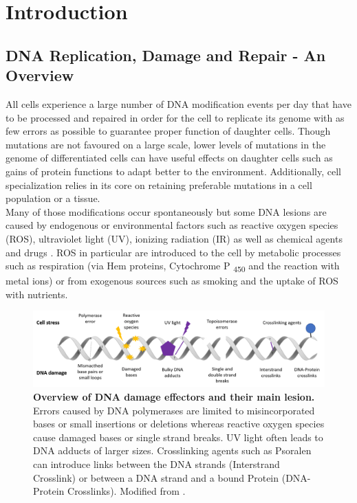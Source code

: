 \section{Introduction}
\label{sec:intro}
\subsection{DNA Replication, Damage and Repair -  An Overview}
All cells experience a large number of DNA modification events per day that have to be processed and repaired in order for the cell to replicate its genome with as few errors as possible to guarantee proper function of daughter cells. Though mutations are not favoured on a large scale, lower levels of mutations in the genome of differentiated cells can have useful effects on daughter cells such as gains of protein functions to adapt better to the environment. Additionally, cell specialization relies in its core on retaining preferable mutations in a cell population or a tissue.\\
Many of those modifications occur spontaneously but some DNA lesions are caused by endogenous or environmental factors such as reactive oxygen species (ROS), ultraviolet light (UV), ionizing radiation (IR) as well as chemical agents and drugs \citep{Loeb.2008}. ROS in particular are introduced to the cell by metabolic processes such as respiration (via Hem proteins, Cytochrome P \textsubscript{450} and the reaction with metal ions) or from exogenous sources such as smoking and the uptake of ROS with nutrients.\\
\begin{figure}[H]
        \includegraphics[width=\textwidth]{resources/images/Intro/damageTypes.png}
        \caption[Overview of DNA damage effectors and their main lesions]{\textbf{Overview of DNA damage effectors and their main lesion.} Errors caused by DNA polymerases are limited to misincorporated bases or small insertions or deletions whereas reactive oxygen species cause damaged bases or single strand breaks. UV light often leads to DNA adducts of larger sizes. Crosslinking agents such as Psoralen can introduce links between the DNA strands (Interstrand Crosslink) or between a DNA strand and a bound Protein (DNA-Protein Crosslinks). Modified from \cite{Massey.2018}.}
        \label{fig:damOverview}
\end{figure}
